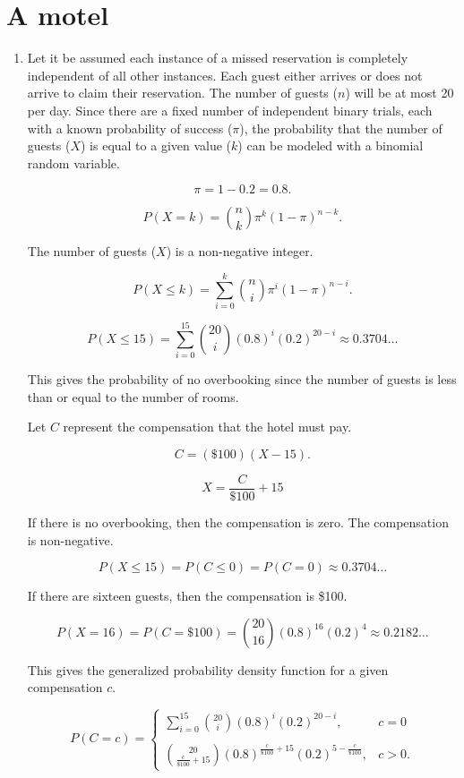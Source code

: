 \documentclass[12pt]{article}
\begin{document}
\section{A motel}
\begin{enumerate}
\item
Let it be assumed each instance of a missed reservation is completely independent of all other instances. Each guest either arrives or does not arrive to claim their reservation. The number of guests ($n$) will be at most 20 per day. Since there are a fixed number of independent binary trials, each with a known probability of success ($\pi$), the probability that the number of guests ($X$) is equal to a given value ($k$) can be modeled with a binomial random variable. 

\[\pi=1-0.2=0.8.\]

\[P(X=k)={\binom{n}{k}}\pi^k(1-\pi)^{n-k}.\]

The number of guests ($X$) is a non-negative integer.

\[P(X\leq k)=\sum^{k}_{i=0}{\binom{n}{i}\pi^i(1-\pi)^{n-i}}.\]

\[P(X\leq 15)=\sum^{15}_{i=0}{\binom{20}{i}(0.8)^i(0.2)^{20-i}\approx 0.3704}\dots\]

This gives the probability of no overbooking since the number of guests is less than or equal to the number of rooms.

Let $C$ represent the compensation that the hotel must pay.

\[C=(\$100)(X-15).\]

\[X=\frac{C}{\$100}+15\]

If there is no overbooking, then the compensation is zero. The compensation is non-negative. 

\[P(X\leq 15)=P(C\leq 0)=P(C=0)\approx 0.3704\dots\]

If there are sixteen guests, then the compensation is \$100.

\[P(X=16)=P(C=\$100)=\binom{20}{16}(0.8)^{16}(0.2)^4\approx 0.2182\dots\]

This gives the generalized probability density function for a given compensation $c$.

\begin{equation*}
P(C=c)=\begin{cases}
    \sum^{15}_{i=0}{\binom{20}{i}(0.8)^i(0.2)^{20-i}},&c=0\\\\
    \binom{20}{\frac{c}{\$100}+15}(0.8)^{\frac{c}{\$100}+15}(0.2)^{5-\frac{c}{\$100}},&c>0.
\end{cases}
\end{equation*}


\end{enumerate}
\end{document}
